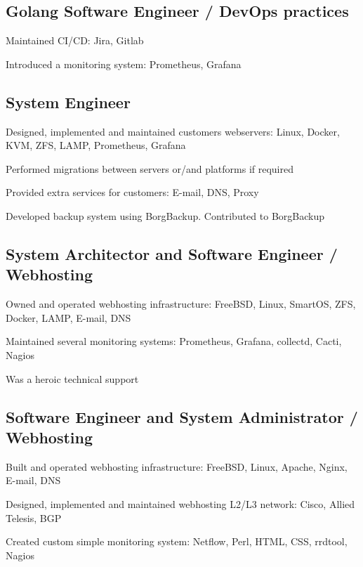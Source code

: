\documentclass[letter,10pt]{article}
\begin{document}
\subsection{{Golang Software Engineer / DevOps practices}}
\begin{zitemize}
\item Maintained CI/CD: Jira, Gitlab
\item Introduced a monitoring system: Prometheus, Grafana
\end{zitemize}

\subsection{{System Engineer}}
\begin{zitemize}
\item Designed, implemented and maintained customers webservers: Linux, Docker, KVM, ZFS, LAMP, Prometheus, Grafana
\item Performed migrations between servers or/and platforms if required
\item Provided extra services for customers: E-mail, DNS, Proxy
\item Developed backup system using BorgBackup. Contributed to BorgBackup
\end{zitemize}


\subsection{{System Architector and Software Engineer / Webhosting}}
\begin{zitemize}
\item Owned and operated webhosting infrastructure: FreeBSD, Linux, SmartOS, ZFS, Docker, LAMP, E-mail, DNS
\item Maintained several monitoring systems: Prometheus, Grafana, collectd, Cacti, Nagios
\item Was a heroic technical support
\end{zitemize}

\subsection{{Software Engineer and System Administrator / Webhosting}}
\begin{zitemize}
\item Built and operated webhosting infrastructure: FreeBSD, Linux, Apache, Nginx, E-mail, DNS
\item Designed, implemented and maintained webhosting L2/L3 network: Cisco, Allied Telesis, BGP
\item Created custom simple monitoring system: Netflow, Perl, HTML, CSS, rrdtool, Nagios
\end{zitemize}
\end{document}
